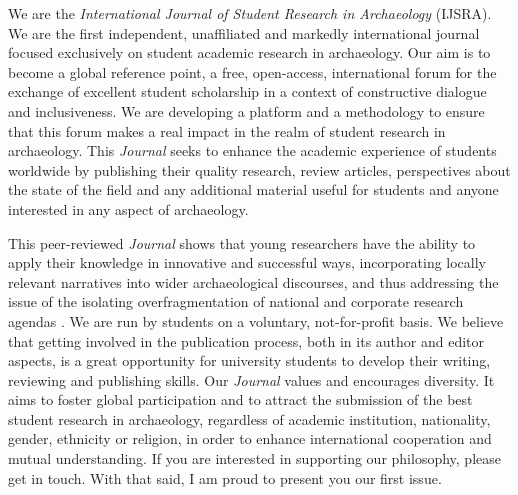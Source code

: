 We are the \emph{International Journal of Student Research in Archaeology} (IJSRA). We are the first independent, unaffiliated and markedly international journal focused exclusively on student academic research in archaeology. Our aim is to become a global reference point, a free, open-access, international forum for the exchange of excellent student scholarship in a context of constructive dialogue and inclusiveness. We are developing a platform and a methodology to ensure that this forum makes a real impact in the realm of student research in archaeology. This \emph{Journal} seeks to enhance the academic experience of students worldwide by publishing their quality research, review articles, perspectives about the state of the field and any additional material useful for students and anyone interested in any aspect of archaeology.

This peer-reviewed \emph{Journal} shows that young researchers have the ability to apply their knowledge in innovative and successful ways, incorporating locally relevant narratives into wider archaeological discourses, and thus addressing the issue of the isolating over\-fragmentation of national and corporate research agendas \parencite{Mizoguchi_2015}. 
We are run by students on a voluntary, not-for-profit basis. We believe that getting involved in the publication process, both in its author and editor aspects, is a great opportunity for university students to develop their writing, reviewing and publishing skills. 
Our \emph{Journal} values and encourages diversity. 
It aims to foster global participation and to attract the submission of the best student research in archaeology, regardless of academic institution, nationality, gender, ethnicity or religion, in order to enhance international cooperation and mutual understanding. If you are interested in supporting our philosophy, please get in touch. With that said, I am proud to present you our first issue. 

\printbibliography[heading=subbibnumbered] 

\label{editorial:lastpage}
\closingarticle